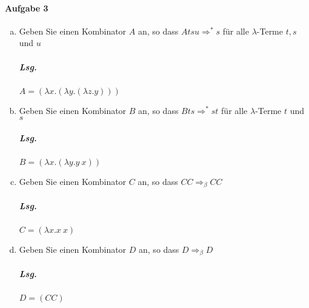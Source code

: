 \documentclass{scrreprt}
\begin{document}
\paragraph{Aufgabe 3}
\begin{enumerate}[(a)]
\item Geben Sie einen Kombinator $A$ an, so dass
  $A t s u \Rightarrow^* s$ für alle $\lambda$-Terme $t, s$ und $u$

  \subparagraph{Lsg.} $A = (\lambda x.(\lambda y.(\lambda z.y)))$

\item Geben Sie einen Kombinator $B$ an, so dass
  $B t s \Rightarrow^* s t$ für alle $\lambda$-Terme $t$ und $s$

  \subparagraph{Lsg.} $B = (\lambda x.(\lambda y.y \: x))$

\item Geben Sie einen Kombinator $C$ an, so dass $C C \Rightarrow_{\beta} C C$

  \subparagraph{Lsg.} $C = (\lambda x.x \: x)$

\item Geben Sie einen Kombinator $D$ an, so dass $D \Rightarrow_{\beta} D$

  \subparagraph{Lsg.} $D = (CC)$
\end{enumerate}
\end{document}

